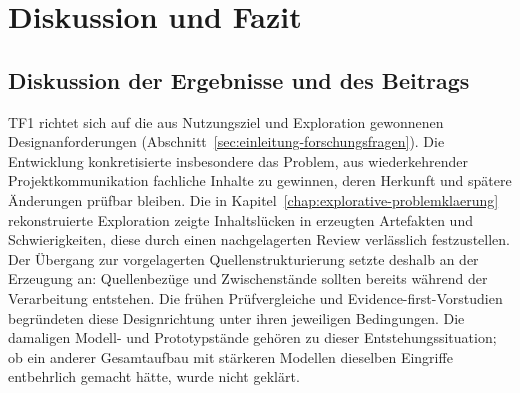 
\chapter{Diskussion und Fazit}
\label{chap:diskussion-fazit}

\section{Diskussion der Ergebnisse und des Beitrags}
\label{sec:diskussion-beitrag}

TF1 richtet sich auf die aus Nutzungsziel und Exploration gewonnenen
Designanforderungen (Abschnitt~\ref{sec:einleitung-forschungsfragen}).
Die Entwicklung konkretisierte insbesondere das Problem, aus
wiederkehrender Projektkommunikation fachliche Inhalte zu gewinnen,
deren Herkunft und spätere Änderungen prüfbar bleiben.
Die in Kapitel~\ref{chap:explorative-problemklaerung} rekonstruierte
Exploration zeigte Inhaltslücken in erzeugten Artefakten und
Schwierigkeiten, diese durch einen nachgelagerten Review verlässlich
festzustellen. Der Übergang zur vorgelagerten Quellenstrukturierung
setzte deshalb an der Erzeugung an: Quellenbezüge und Zwischenstände
sollten bereits während der Verarbeitung entstehen. Die frühen
Prüfvergleiche und Evidence-first-Vorstudien begründeten diese
Designrichtung unter ihren jeweiligen Bedingungen. Die damaligen
Modell- und Prototypstände gehören zu dieser Entstehungssituation;
ob ein anderer Gesamtaufbau mit stärkeren Modellen dieselben
Eingriffe entbehrlich gemacht hätte, wurde nicht geklärt.

